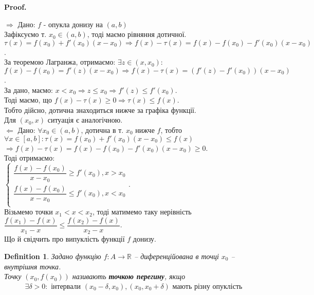 \documentclass[a4paper, 14pt]{article}
\makeatletter
\def\qed{$\blacksquare$}
\def\rightproof{$\boxed{\Rightarrow}$ }
\def\leftproof{$\boxed{\Leftarrow}$ }
\theoremstyle{theoremdd}
\theoremstyle{theoremdd}
\newtheorem{definition}[theorem]{Definition}
\theoremstyle{theoremdd}
\theoremstyle{theoremdd}
\theoremstyle{theoremdd}
\theoremstyle{theoremdd}
\theoremstyle{theoremdd}
\theoremstyle{theoremdd}
\renewenvironment{proof}[1][Proof.\\]{\par
\pushQED{\hfill \qed}%
\normalfont \topsep6\p@\@plus6\p@\relax
\trivlist
\item\relax
{\bfseries
#1\@addpunct{.}}\hspace\labelsep\ignorespaces
}{%
\popQED\endtrivlist\@endpefalse
}
\makeatother
\begin{document}
\begin{proof}
\rightproof Дано: $f$ - опукла донизу на $(a,b)$\\
Зафіксуємо т. $x_0 \in (a,b)$, тоді маємо рівняння дотичної.\\
$\tau(x) = f(x_0) + f'(x_0)(x-x_0) \Rightarrow f(x) - \tau(x) = f(x) - f(x_0) - f'(x_0)(x-x_0)$.\\
За теоремою Лагранжа, отримаємо: $\exists z \in (x,x_0):$ \\
$f(x) - f(x_0) = f'(z)(x-x_0) \Rightarrow f(x) - \tau(x) = (f'(z) - f'(x_0))(x-x_0)$.\\
За дано, маємо: $x < x_0 \Rightarrow z \leq x_0 \Rightarrow f'(z) \leq f'(x_0)$.\\
Тоді маємо, що $f(x) - \tau(x) \geq 0 \Rightarrow \tau(x) \leq f(x)$.\\
Тобто дійсно, дотична знаходиться нижче за графіка функції.\\
Для $(x_0,x)$ ситуація є аналогічною.
\bigskip \\
\leftproof Дано: $\forall x_0 \in (a,b)$, дотична в т. $x_0$ нижче $f$, тобто\\
$\forall x \in [a,b]: \tau(x) = f(x_0) + f'(x_0)(x-x_0) \leq f(x)$\\
$\Rightarrow f(x) - \tau(x) = f(x) - f(x_0) - f'(x_0)(x-x_0) \geq 0$.\\
Тоді отримаємо:\\
$\begin{cases}
\dfrac{f(x)-f(x_0)}{x-x_0} \geq f'(x_0), x > x_0 \\
\dfrac{f(x)-f(x_0)}{x-x_0} \leq f'(x_0), x < x_0 \\
\end{cases}
$.\\
Візьмемо точки $x_1 < x < x_2$, тоді матимемо таку нерівність\\
$\dfrac{f(x_1)-f(x)}{x_1-x} \leq \dfrac{f(x_2)-f(x)}{x_2-x}$.\\
Що й свідчить про випуклість функції $f$ донизу.
\end{proof}
\fi

\begin{definition}
Задано функцію $f \colon A \to \mathbb{R}$ -- диференційована в точці $x_0$ -- внутрішня точка.\\
Точку $(x_0,f(x_0))$ називають \textbf{точкою перегину}, якщо
\begin{align*}
\exists \delta > 0: \text{ інтервали } (x_0-\delta,x_0), (x_0,x_0+\delta) \text{ мають різну опуклість}
\end{align*}
\end{definition}
\end{document}

